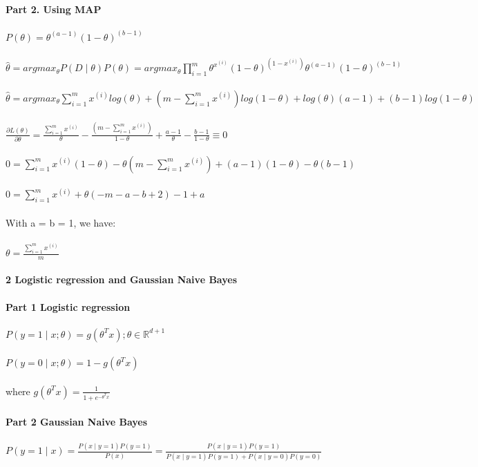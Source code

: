 \documentclass[12pt]{article}
\begin{document}
\noindent \textbf{Part 2. Using MAP}\\
\\
$P(\theta) = \theta^{(a-1)} (1-\theta)^{(b-1)}$\\
\\
$\widehat{\theta} = argmax_\theta P(D \mid \theta) P(\theta) = argmax_\theta \prod_{i=1}^m \theta^{x^{(i)}} (1-\theta)^{(1-x^{(i)})} \theta^{(a-1)} (1-\theta)^{(b-1)}$\\
\\
$\widehat{\theta} = argmax_\theta \sum_{i=1}^m x^{(i)}log(\theta) + (m - \sum_{i=1}^m x^{(i)}) log(1-\theta) + log(\theta) (a-1) + (b-1) log(1-\theta)$\\
\\
$\frac{\partial L(\theta)}{\partial \theta} = \frac {\sum_{i=1}^m x^{(i)}} {\theta} - \frac {(m-\sum_{i=1}^m x^{(i)})} {1-\theta} + \frac{a-1}{\theta} - \frac{b-1}{1-\theta} \equiv 0$
\\
\\
$0 = \sum_{i=1}^m x^{(i)} (1-\theta) - \theta (m-\sum_{i=1}^m x^{(i)}) + (a-1)(1-\theta) - \theta(b-1)$\\
\\
$0 = \sum_{i=1}^m x^{(i)} + \theta (-m -a -b +2 ) -1 + a$
\\
\\
With a = b = 1, we have:\\
\\
$\theta = \frac {\sum_{i=1}^m x^{(i)}} {m}$
\\
\\
\noindent \textbf{2 Logistic regression and Gaussian Naive Bayes} \\
\\
\noindent \textbf{Part 1 Logistic regression}
\\
\\
$P(y = 1 \mid x; \theta) = g(\theta^Tx) ; \theta \in \mathbb{R} ^{d + 1}$\\
\\
$P(y = 0 \mid x; \theta) = 1- g(\theta^Tx)$\\
\\
where $g(\theta^Tx) = \frac {1}{1 + e ^{-\theta^{T}x}} $
\\
\\
\noindent \textbf{Part 2 Gaussian Naive Bayes}
\\
\\
$P(y = 1 \mid x) = \frac{P(x \mid y = 1) P(y = 1)} {P(x)} = \frac {P(x \mid y = 1) P (y = 1) }{P(x \mid y = 1) P(y =1) + P (x \mid y = 0) P (y = 0)}$
\\
\end{document}
